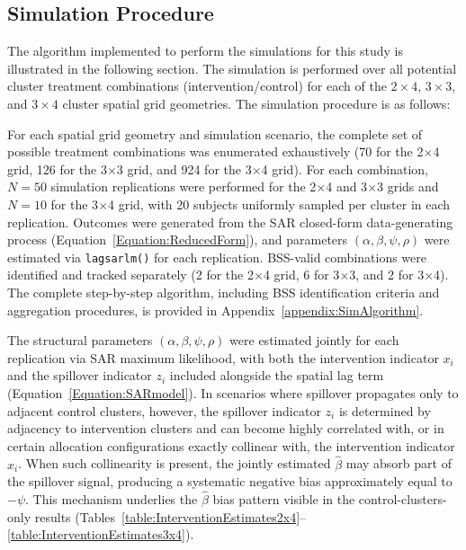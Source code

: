 \documentclass{article}[11pt]
\begin{document}
\subsection{Simulation Procedure}\label{section:SimProcedure}

The algorithm implemented to perform the simulations for this study is illustrated in the following section. The simulation is performed over all potential cluster treatment combinations (intervention/control) for each of the $2\times4$, $3\times3$, and $3\times4$ cluster spatial grid geometries. The simulation procedure is as follows:

For each spatial grid geometry and simulation scenario, the complete set of possible treatment combinations was enumerated exhaustively (70 for the 2$\times$4 grid, 126 for the 3$\times$3 grid, and 924 for the 3$\times$4 grid). For each combination, $N = 50$ simulation replications were performed for the 2$\times$4 and 3$\times$3 grids and $N = 10$ for the 3$\times$4 grid, with 20 subjects uniformly sampled per cluster in each replication. Outcomes were generated from the SAR closed-form data-generating process (Equation~\ref{Equation:ReducedForm}), and parameters $(\alpha, \beta, \psi, \rho)$ were estimated via \texttt{lagsarlm()} for each replication. BSS-valid combinations were identified and tracked separately (2 for the 2$\times$4 grid, 6 for 3$\times$3, and 2 for 3$\times$4). The complete step-by-step algorithm, including BSS identification criteria and aggregation procedures, is provided in Appendix~\ref{appendix:SimAlgorithm}.

The structural parameters $(\alpha, \beta, \psi, \rho)$ were estimated jointly for each replication via SAR maximum likelihood, with both the intervention indicator $x_i$ and the spillover indicator $z_i$ included alongside the spatial lag term (Equation~\ref{Equation:SARmodel}). In scenarios where spillover propagates only to adjacent control clusters, however, the spillover indicator $z_i$ is determined by adjacency to intervention clusters and can become highly correlated with, or in certain allocation configurations exactly collinear with, the intervention indicator $x_i$. When such collinearity is present, the jointly estimated $\hat{\beta}$ may absorb part of the spillover signal, producing a systematic negative bias approximately equal to $-\psi$. This mechanism underlies the $\hat{\beta}$ bias pattern visible in the control-clusters-only results (Tables~\ref{table:InterventionEstimates2x4}--\ref{table:InterventionEstimates3x4}).
\end{document}
